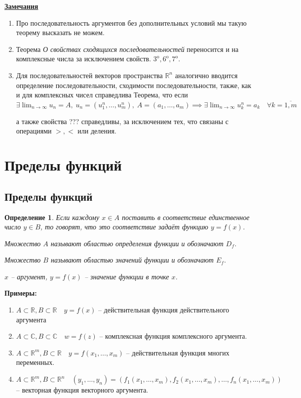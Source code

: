 \documentclass[a4paper,oneside]{article}
\newcommand{\parspace}{\vspace{10pt}}
\newcommand{\dslim}{\displaystyle\lim}
\newcommand{\dslimn}{\dslim_{n \to \infty}}
\newcommand{\prop}[1]{#1^{\text{o}}}
\newcommand{\R}{\mathbb{R}}
\newcommand{\bb}[1]{\mathbb{#1}}
\newtheorem{definition}{Определение}[subsection]
\begin{document}
\underline{\textbf{Замечания}}
\begin{enumerate}
    \item Про последовательность аргументов без дополнительных условий мы такую
    теорему высказать не можем.

    \item Теорема \textit{О свойствах сходящихся последовательностей} переносится
    и на комплексные числа за исключением свойств. $\prop{3}, \prop{6}, \prop{7}$.

    \item Для последовательностей векторов пространства $\mathbb{R}^n$ аналогично
    вводится определение последовательности, сходимости последовательности,
    также, как и для комплексных чисел справедлива Теорема, что если
    $\exists \dslimn u_n = A, \; u_n = (u_1^n, \dots, u_m^n), \;
    A = (a_1, \dots, a_m) \implies \exists \dslimn u_k^n = a_k \quad 
    \forall k = \overline{1, m}$

    а также свойства ??? справедливы, за исключением тех, что связаны
    с операциями $>, <$ или деления.
\end{enumerate}

\section{Пределы функций}

\subsection{Пределы функций}

\begin{definition}
    Если каждому $x \in A$ поставить в соответствие единственное число $y \in B$,
    то говорят, что это соответствие задаёт функцию $y = f(x)$.

    Множество $A$ называют \textit{областью определения функции} и обозначают $D_f$.

    Множество $B$ называют \textit{областью значений функции} и обозначают $E_f$.

    $x$ -- аргумент, $y = f(x)$ -- значение функции в точке $x$.
\end{definition}

\parspace

\textbf{Примеры:}
\begin{enumerate}
    \item $A \subset \R, B \subset \R \quad y = f(x)$ -- действительная
    функция действительного аргумента

    \item $A \subset \bb{C}, B \subset \bb{C} \quad w = f(z)$ -- комплексная
    функция комплексного аргумента.

    \item $A \subset \R^m, B \subset \R \quad y = f(x_1, \dots, x_m)$ --
    действительная функция многих переменных.

    \item $A \subset \R^m, B \subset \R^n \quad 
    (y_1, \dots, y_n) = (f_1(x_1, \dots, x_m), f_2(x_1, \dots, x_m), \dots, f_n(x_1, \dots, x_m))$ --
    векторная функция векторного аргумента.
\end{enumerate}
\end{document}
